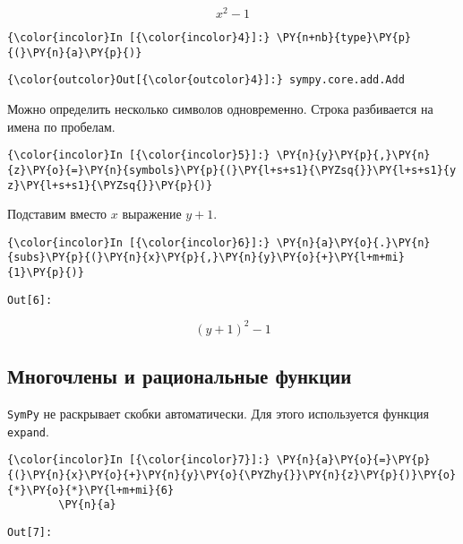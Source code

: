     \[x^{2} - 1\]

    

    \begin{Verbatim}[commandchars=\\\{\}]
{\color{incolor}In [{\color{incolor}4}]:} \PY{n+nb}{type}\PY{p}{(}\PY{n}{a}\PY{p}{)}
\end{Verbatim}

            \begin{Verbatim}[commandchars=\\\{\}]
{\color{outcolor}Out[{\color{outcolor}4}]:} sympy.core.add.Add
\end{Verbatim}
        
    Можно определить несколько символов одновременно. Строка разбивается на
имена по пробелам.

    \begin{Verbatim}[commandchars=\\\{\}]
{\color{incolor}In [{\color{incolor}5}]:} \PY{n}{y}\PY{p}{,}\PY{n}{z}\PY{o}{=}\PY{n}{symbols}\PY{p}{(}\PY{l+s+s1}{\PYZsq{}}\PY{l+s+s1}{y z}\PY{l+s+s1}{\PYZsq{}}\PY{p}{)}
\end{Verbatim}

    Подставим вместо \(x\) выражение \(y+1\).

    \begin{Verbatim}[commandchars=\\\{\}]
{\color{incolor}In [{\color{incolor}6}]:} \PY{n}{a}\PY{o}{.}\PY{n}{subs}\PY{p}{(}\PY{n}{x}\PY{p}{,}\PY{n}{y}\PY{o}{+}\PY{l+m+mi}{1}\PY{p}{)}
\end{Verbatim}
\texttt{\color{outcolor}Out[{\color{outcolor}6}]:}
    
    \[\left(y + 1\right)^{2} - 1\]

    

\subsection{Многочлены и рациональные функции}
\label{sympy02}

\texttt{SymPy} не раскрывает скобки автоматически. Для этого
используется функция \texttt{expand}.

    \begin{Verbatim}[commandchars=\\\{\}]
{\color{incolor}In [{\color{incolor}7}]:} \PY{n}{a}\PY{o}{=}\PY{p}{(}\PY{n}{x}\PY{o}{+}\PY{n}{y}\PY{o}{\PYZhy{}}\PY{n}{z}\PY{p}{)}\PY{o}{*}\PY{o}{*}\PY{l+m+mi}{6}
        \PY{n}{a}
\end{Verbatim}
\texttt{\color{outcolor}Out[{\color{outcolor}7}]:}
    
